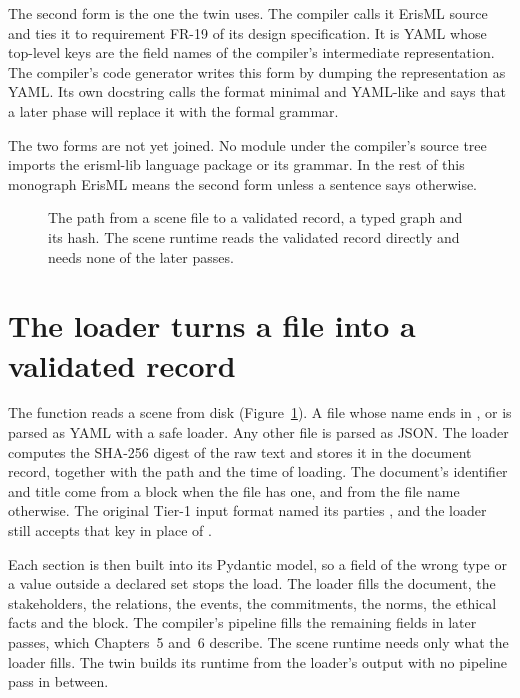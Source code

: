 The second form is the one the twin uses. The compiler calls it ErisML source and ties it to
requirement FR-19 of its design specification. It is YAML whose top-level keys are the field names
of the compiler's intermediate representation. The compiler's code generator writes this form by
dumping the representation as YAML. Its own docstring calls the format minimal and YAML-like and
says that a later phase will replace it with the formal grammar.

The two forms are not yet joined. No module under the compiler's source tree imports the erisml-lib
language package or its grammar. In the rest of this monograph ErisML means the second form unless
a sentence says otherwise.

\begin{figure}[t]
\centering

\caption{The path from a scene file to a validated record, a typed graph and its hash. The scene
runtime reads the validated record directly and needs none of the later passes.}
\label{fig:erisml-source-to-hash}
\end{figure}

\section{The loader turns a file into a validated record}\label{sec:erisml-loader}

The function  reads a scene from disk
(Figure~\ref{fig:erisml-source-to-hash}). A file whose name ends in ,  or
 is parsed as YAML with a safe loader. Any other file is parsed as JSON. The loader
computes the SHA-256 digest of the raw text and stores it in the document record, together with the
path and the time of loading. The document's identifier and title come from a 
block when the file has one, and from the file name otherwise. The original Tier-1 input format
named its parties , and the loader still accepts that key in place of
.

Each section is then built into its Pydantic model, so a field of the wrong type or a value outside
a declared set stops the load. The loader fills the document, the stakeholders, the relations, the
events, the commitments, the norms, the ethical facts and the  block. The compiler's
pipeline fills the remaining fields in later passes, which Chapters~5 and~6 describe. The scene
runtime needs only what the loader fills. The twin builds its runtime from the loader's output with
no pipeline pass in between.


